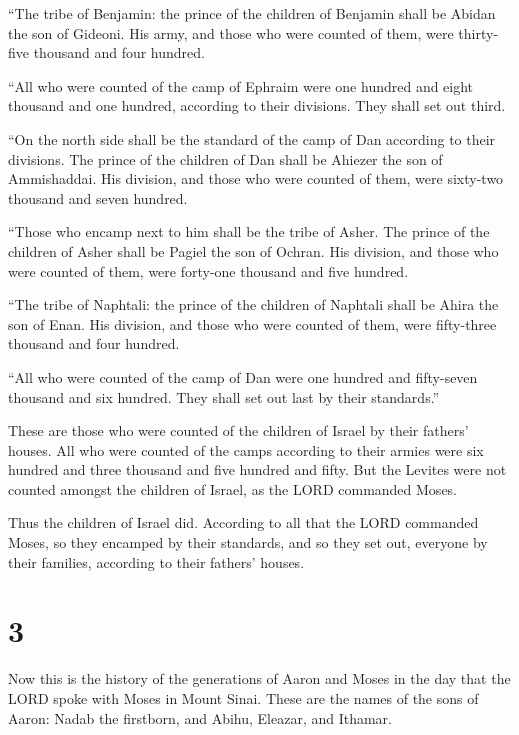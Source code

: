  ``The tribe of Benjamin: the prince of the children of
Benjamin shall be Abidan the son of Gideoni.  His army,
and those who were counted of them, were thirty-five thousand and four
hundred.

 ``All who were counted of the camp of Ephraim were one
hundred and eight thousand and one hundred, according to their
divisions. They shall set out third.

 ``On the north side shall be the standard of the camp of
Dan according to their divisions. The prince of the children of Dan
shall be Ahiezer the son of Ammishaddai.  His division,
and those who were counted of them, were sixty-two thousand and seven
hundred.

 ``Those who encamp next to him shall be the tribe of
Asher. The prince of the children of Asher shall be Pagiel the son of
Ochran.  His division, and those who were counted of
them, were forty-one thousand and five hundred.

 ``The tribe of Naphtali: the prince of the children of
Naphtali shall be Ahira the son of Enan.  His division,
and those who were counted of them, were fifty-three thousand and four
hundred.

 ``All who were counted of the camp of Dan were one
hundred and fifty-seven thousand and six hundred. They shall set out
last by their standards.''

 These are those who were counted of the children of
Israel by their fathers' houses. All who were counted of the camps
according to their armies were six hundred and three thousand and five
hundred and fifty.  But the Levites were not counted
amongst the children of Israel, as the LORD commanded Moses.

 Thus the children of Israel did. According to all that
the LORD commanded Moses, so they encamped by their standards, and so
they set out, everyone by their families, according to their fathers'
houses.

\hypertarget{section-2}{%
\section{3}\label{section-2}}

 Now this is the history of the generations of Aaron and
Moses in the day that the LORD spoke with Moses in Mount Sinai.
 These are the names of the sons of Aaron: Nadab the
firstborn, and Abihu, Eleazar, and Ithamar.

